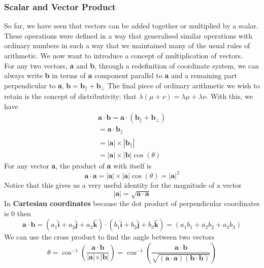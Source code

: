 \documentclass[11pt,titlepage]{article}
\numberwithin{equation}{section}
\begin{document}
\subsubsection{Scalar and Vector Product}
So far, we have seen that vectors can be added together or multiplied by a scalar. These operations were defined in a way that generalised similar operations with ordinary numbers in such a way that we maintained many of the usual rules of arithmetic. We now want to introduce a concept of multiplication of vectors.
\\
For any two vectors, \textbf{a} and \textbf{b}, through a redefinition of coordinate system,
we can always write \textbf{b} in terms of \textbf{a} component parallel to \textbf{a} and a remaining part perpendicular to \textbf{a}, $\mathbf{b}=\mathbf{b}_{\parallel}+\mathbf{b}_{\perp}$
The final piece of ordinary arithmetic we wish to retain is the concept of
distributivity; that $\lambda(\mu + \nu) = \lambda\mu + \lambda\nu$. With this, we have
\begin{equation}
    \begin{split}
        \mathbf{a}\cdot\mathbf{b}=\mathbf{a}\cdot(\mathbf{b}_{\parallel}+\mathbf{b}_{\perp}) \\
        =\mathbf{a}\cdot\mathbf{b}_{\parallel}\\
        =|\mathbf{a}|\times|\mathbf{b}_{\parallel}|\\
        =|\mathbf{a}|\times|\mathbf{b}|\cos(\theta)  
    \end{split}
\end{equation}
For any vector \textbf{a}, the product of \textbf{a} with itself is
\begin{equation}
    \mathbf{a}\cdot\mathbf{a}=|\mathbf{a}|\times|\mathbf{a}|\cos(\theta)=|\mathbf{a}|^2
\end{equation}
Notice that this gives us a very useful identity for the magnitude of a vector
\begin{equation}
    |\mathbf{a}|=\sqrt{\mathbf{a}\cdot\mathbf{a}}
\end{equation}
In \textbf{Cartesian coordinates} because the dot product of perpendicular coordinates is 0 then
\begin{equation}
    \mathbf{a}\cdot\mathbf{b}=(a_1\mathbf{\hat{i}}+a_2\mathbf{\hat{j}}+a_3\mathbf{\hat{k}})\cdot(b_1\mathbf{\hat{i}}+b_2\mathbf{\hat{j}}+b_3\mathbf{\hat{k}})=(a_1b_1+a_2b_2+a_3b_3)
\end{equation}
We can use the cross product to find the angle between two vectors
\begin{equation}
    \theta=\cos^{-1}\left(\frac{\mathbf{a}\cdot\mathbf{b}}{|\mathbf{a|\times|\mathbf{b}|}}\right)=\cos^{-1}\left(\frac{\mathbf{a}\cdot\mathbf{b}}{\sqrt{(\mathbf{a}\cdot\mathbf{a})(\mathbf{b\cdot\mathbf{b}})}}\right)
\end{equation}
\end{document}
